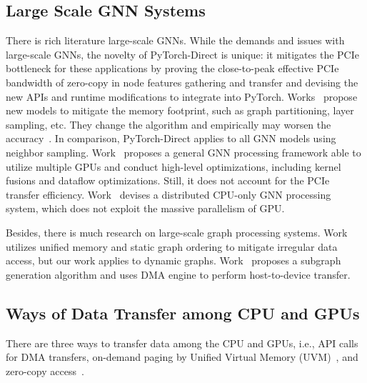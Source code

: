 \subsection{Large Scale GNN Systems}
There is rich literature  large-scale GNNs.
While  the demands and issues with large-scale GNNs, the novelty of PyTorch-Direct is unique: it mitigates the PCIe bottleneck for these applications by proving the close-to-peak effective PCIe bandwidth of zero-copy in node features gathering and transfer and devising the new APIs and runtime modifications to integrate into PyTorch.
Works~\cite{sign_icml_grl2020,graphsaint-ipdps19,graphsaint-iclr20,Chiang2019ClusterGCNAE, Jia2020ImprovingTA} propose new models to mitigate the memory footprint, such as graph partitioning, layer sampling, etc. They change the algorithm and empirically may worsen the accuracy~\cite{ogbLeaderboard}.
In comparison, PyTorch-Direct applies to all GNN models using neighbor sampling.
Work~\cite{SAGA} proposes a general GNN processing framework able to utilize multiple GPUs and conduct high-level optimizations, including kernel fusions and dataflow optimizations. Still, it does not account for the PCIe transfer efficiency.
Work~\cite{zhengDistDGLDistributedGraph2020} devises a distributed CPU-only GNN processing system, which does not exploit the massive parallelism of GPU.


Besides, there is much research on large-scale graph processing systems.
Work~\cite{10.14778/3384345.3384358} utilizes unified memory and static graph ordering to mitigate irregular data access, but our work  applies to dynamic graphs. Work~\cite{10.1145/3342195.3387537} proposes a subgraph generation algorithm and uses DMA engine to perform host-to-device transfer.




\subsection{Ways of Data Transfer among CPU and GPUs}
There are three ways to transfer data among the CPU and GPUs, i.e., API calls for DMA transfers, on-demand paging by Unified Virtual Memory (UVM)~\cite{P100Whitepaper, V100Whitepaper, A100Whitepaper, UVMPrimer, pearson19}, and zero-copy access~\cite{UVMPrimer, minEMOGIEfficientMemoryaccess2020,relTransfer1}.


